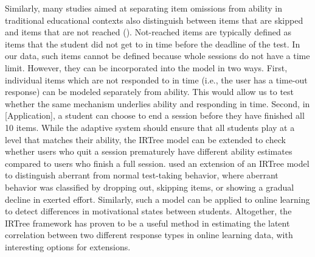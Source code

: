 \documentclass[anonymous,manuscript,review]{acmart}
\begin{document}
Similarly, many studies aimed at separating item omissions from ability in traditional educational contexts also distinguish between items that are skipped and items that are not reached (\cite{glas2008modeling, pohl2014dealing, debeer2017modeling}). Not-reached items are typically defined as items that the student did not get to in time before the deadline of the test. In our data, such items cannot be defined because whole sessions do not have a time limit. However, they can be incorporated into the model in two ways. First, individual items which are not responded to in time (i.e., the user has a time-out response) can be modeled separately from ability. This would allow us to test whether the same mechanism underlies ability and responding in time. Second, in [Application], a student can choose to end a session before they have finished all 10 items. While the adaptive system should ensure that all students play at a level that matches their ability, the IRTree model can be extended to check whether users who quit a session prematurely have different ability estimates compared to users who finish a full session. \citet{huang2020mixture} used an extension of an IRTree model to distinguish aberrant from normal test-taking behavior, where aberrant behavior was classified by dropping out, skipping items, or showing a gradual decline in exerted effort. Similarly, such a model can be applied to online learning to detect differences in motivational states between students. Altogether, the IRTree framework has proven to be a useful method in estimating the latent correlation between two different response types in online learning data, with interesting options for extensions.

\end{document}

